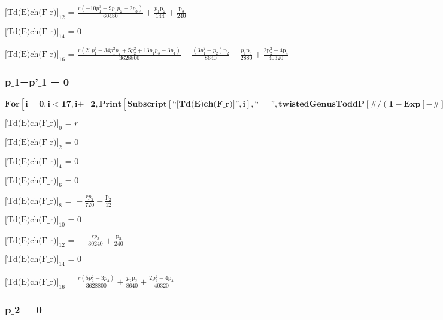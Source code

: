 \documentclass{article}
\newcommand{\unicode}[1]{{}}
\begin{document}
\noindent\(\text{[Td(E)ch(F$\_$r)]}_{12}\text{ = }\frac{r \left(-10 p_1^3+9 p_1 p_2-2 p_3\right)}{60480}+\frac{p_1 \text{p$\unicode{02bc}$}_2}{144}+\frac{\text{p$\unicode{02bc}$}_3}{240}\)

\noindent\(\text{[Td(E)ch(F$\_$r)]}_{14}\text{ = }0\)

\noindent\(\text{[Td(E)ch(F$\_$r)]}_{16}\text{ = }\frac{r \left(21 p_1^4-34 p_1^2 p_2+5 p_2^2+13 p_1 p_3-3 p_4\right)}{3628800}-\frac{\left(3 p_1^2-p_2\right)
\text{p$\unicode{02bc}$}_2}{8640}-\frac{p_1 \text{p$\unicode{02bc}$}_3}{2880}+\frac{2 \text{p$\unicode{02bc}$}_2^2-4 \text{p$\unicode{02bc}$}_4}{40320}\)

\subsubsection*{p$\_$1=p{'}$\_$1 = 0}

\begin{doublespace}
\noindent\(\pmb{\text{For}\left[i=0,i<17,i\text{+=}2, \text{Print}\left[\text{Subscript}[\text{{``}[Td(E)ch(F$\_$r)]{''}},i],\text{{``} = {''}},\text{twistedGenusToddP}[\#/(1-\text{Exp}[-\#])\&,i]\text{/.}p_1\to
0\text{/.}\text{p$\unicode{02bc}$}_1\to 0\right]\right]}\)
\end{doublespace}

\noindent\(\text{[Td(E)ch(F$\_$r)]}_0\text{ = }r\)

\noindent\(\text{[Td(E)ch(F$\_$r)]}_2\text{ = }0\)

\noindent\(\text{[Td(E)ch(F$\_$r)]}_4\text{ = }0\)

\noindent\(\text{[Td(E)ch(F$\_$r)]}_6\text{ = }0\)

\noindent\(\text{[Td(E)ch(F$\_$r)]}_8\text{ = }-\frac{r p_2}{720}-\frac{\text{p$\unicode{02bc}$}_2}{12}\)

\noindent\(\text{[Td(E)ch(F$\_$r)]}_{10}\text{ = }0\)

\noindent\(\text{[Td(E)ch(F$\_$r)]}_{12}\text{ = }-\frac{r p_3}{30240}+\frac{\text{p$\unicode{02bc}$}_3}{240}\)

\noindent\(\text{[Td(E)ch(F$\_$r)]}_{14}\text{ = }0\)

\noindent\(\text{[Td(E)ch(F$\_$r)]}_{16}\text{ = }\frac{r \left(5 p_2^2-3 p_4\right)}{3628800}+\frac{p_2 \text{p$\unicode{02bc}$}_2}{8640}+\frac{2
\text{p$\unicode{02bc}$}_2^2-4 \text{p$\unicode{02bc}$}_4}{40320}\)

\subsubsection*{p$\_$2 = 0}
\end{document}
